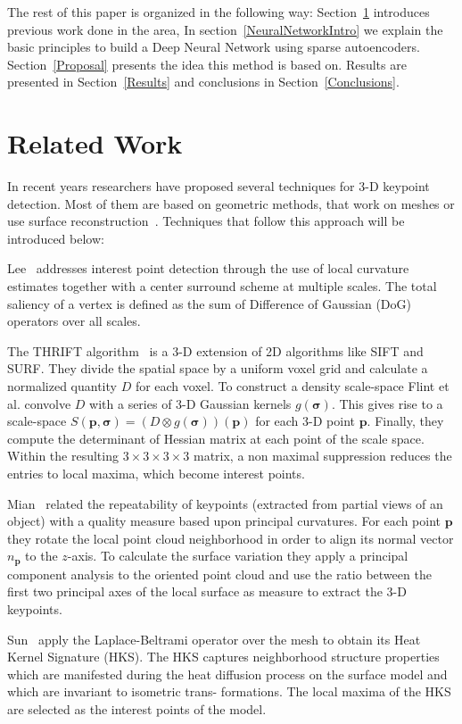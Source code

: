 \documentclass{comjnl}
\begin{document}
The rest of this paper is organized in the following way:
Section~\ref{RelatedWork} introduces previous work done in the area,
In section~\ref{NeuralNetworkIntro} we explain the basic principles to
build a Deep Neural Network using sparse autoencoders.
Section~\ref{Proposal} presents the idea this method is based on. Results
are presented in Section~\ref{Results} and conclusions in
Section~\ref{Conclusions}.

\section{Related Work} \label{RelatedWork}
In recent years researchers have proposed several techniques for
3-D keypoint detection. Most of them are based on geometric methods,
that work on meshes or use surface reconstruction~\cite{garstka2015fast}.
Techniques that follow this approach will be introduced below:

Lee~\cite{Lee2005} addresses interest point detection through the
use of local curvature estimates together with a center
surround scheme at multiple scales. The total saliency of
a vertex is defined as the sum of Difference of Gaussian
(DoG) operators over all scales.

The THRIFT algorithm~\cite{flint2007thrift} is a 3-D extension of 2D algorithms
like SIFT and SURF. They divide the spatial space by a uniform voxel grid
and calculate a normalized quantity $D$ for each voxel. To construct a
density scale-space Flint et al. convolve $D$ with a series of 3-D
Gaussian kernels $g(\bm{\sigma})$. This gives rise to a scale-space
$S(\bm{p},\bm{\sigma}) = (D \otimes g(\bm{\sigma}))(\bm{p})$ for each
3-D point $\bm{p}$. Finally, they compute the determinant of Hessian matrix
at each point of the scale space. Within the resulting $3\times3\times3\times3$
matrix, a non maximal suppression reduces the entries to local maxima, which become
interest points.

Mian~\cite{mian2010repeatability} related the repeatability of keypoints
(extracted from partial views of an object) with a quality measure based
upon principal curvatures. For each point $\bm{p}$ they rotate
the local point cloud neighborhood in order to align its normal vector $n_{\bm{p}}$
to the $z$-axis. To calculate the surface variation they apply a principal
component analysis to the oriented point cloud and use the ratio between the
first two principal axes of the local surface as measure to extract the 3-D keypoints.

Sun~\cite{sun2009concise} apply the Laplace-Beltrami operator over
the mesh to obtain its Heat Kernel Signature (HKS). The
HKS captures neighborhood structure properties which
are manifested during the heat diffusion process on the
surface model and which are invariant to isometric trans-
formations. The local maxima of the HKS are selected as
the interest points of the model.
\end{document}
